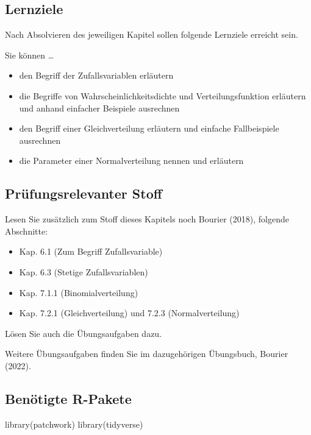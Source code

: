 \documentclass[
  a4paper,
  DIV=11]{scrreprt}
\newenvironment{Shaded}{\begin{snugshade}}{\end{snugshade}}
\newcommand{\FunctionTok}[1]{\textcolor[rgb]{0.28,0.35,0.67}{#1}}
\newcommand{\NormalTok}[1]{\textcolor[rgb]{0.00,0.23,0.31}{#1}}
\providecommand{\tightlist}{%
  \setlength{\itemsep}{0pt}\setlength{\parskip}{0pt}}\usepackage{longtable,booktabs,array}
\theoremstyle{definition}
\theoremstyle{remark}
\begin{document}
\hypertarget{lernziele-3}{%
\subsection{Lernziele}\label{lernziele-3}}

Nach Absolvieren des jeweiligen Kapitel sollen folgende Lernziele
erreicht sein.

Sie können \ldots{}

\begin{itemize}
\tightlist
\item
  den Begriff der Zufallsvariablen erläutern
\item
  die Begriffe von Wahrscheinlichkeitsdichte und Verteilungsfunktion
  erläutern und anhand einfacher Beispiele ausrechnen
\item
  den Begriff einer Gleichverteilung erläutern und einfache
  Fallbeispiele ausrechnen
\item
  die Parameter einer Normalverteilung nennen und erläutern
\end{itemize}

\hypertarget{pruxfcfungsrelevanter-stoff-1}{%
\subsection{Prüfungsrelevanter
Stoff}\label{pruxfcfungsrelevanter-stoff-1}}

Lesen Sie zusätzlich zum Stoff dieses Kapitels noch Bourier (2018),
folgende Abschnitte:

\begin{itemize}
\tightlist
\item
  Kap. 6.1 (Zum Begriff Zufallsvariable)
\item
  Kap. 6.3 (Stetige Zufallsvariablen)
\item
  Kap. 7.1.1 (Binomialverteilung)
\item
  Kap. 7.2.1 (Gleichverteilung) und 7.2.3 (Normalverteilung)
\end{itemize}

Lösen Sie auch die Übungsaufgaben dazu.

Weitere Übungsaufgaben finden Sie im dazugehörigen Übungsbuch, Bourier
(2022).

\hypertarget{benuxf6tigte-r-pakete}{%
\subsection{Benötigte R-Pakete}\label{benuxf6tigte-r-pakete}}

\begin{Shaded}
\begin{Highlighting}[]
\FunctionTok{library}\NormalTok{(patchwork)}
\FunctionTok{library}\NormalTok{(tidyverse)}
\end{Highlighting}
\end{Shaded}
\end{document}
